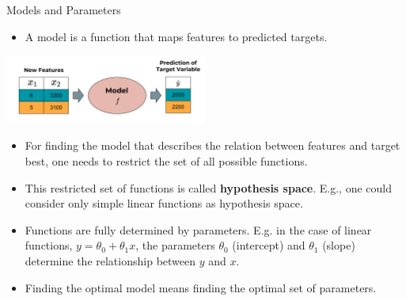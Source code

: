\documentclass[11pt,compress,t,notes=noshow, xcolor=table]{beamer}
\begin{document}
\begin{vbframe}{Models and Parameters}
\small 
\begin{itemize}
    \item A model is a function that maps features to predicted targets.
\end{itemize}

\begin{center}
  \includegraphics[width = 0.5\textwidth]{figure_man/the_model_web.png} 
\end{center}

\small
\begin{itemize}
\item  For finding the model that describes the relation between features and target best, one needs to restrict the set of all possible functions. 
\item This restricted set of functions is called \textbf{hypothesis space}. E.g., one could consider only simple linear functions as hypothesis space.
\item Functions are fully determined by parameters. E.g. in the case of linear functions, $y = \theta_0 + \theta_1 x $, the parameters $\theta_0$ (intercept) and $\theta_1$ (slope) determine the relationship between $y$ and $x$.
\item Finding the optimal model means finding the optimal set of parameters.
\end{itemize}

\end{vbframe}
\end{document}
